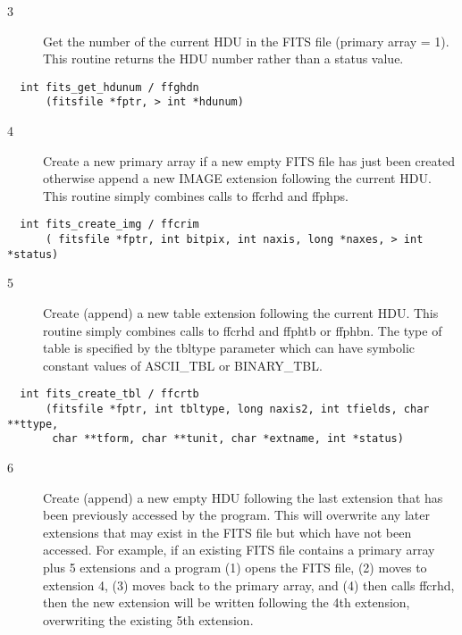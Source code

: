 \begin{description}
\item[3 ] Get the number of the current HDU in the FITS file (primary array = 1).
   This routine returns the HDU number rather than a status value.
\end{description}

\begin{verbatim}
  int fits_get_hdunum / ffghdn
      (fitsfile *fptr, > int *hdunum)
\end{verbatim}

\begin{description}
\item[4 ]Create a new primary array if a new empty FITS file has just been
   created otherwise append a new IMAGE extension following the current HDU.
  This routine simply combines calls to ffcrhd and ffphps.
\end{description}

\begin{verbatim}
  int fits_create_img / ffcrim
      ( fitsfile *fptr, int bitpix, int naxis, long *naxes, > int *status)
\end{verbatim}

\begin{description}
\item[5 ]Create (append) a new table extension following the current HDU.
   This routine simply combines calls to ffcrhd and ffphtb or ffphbn.
   The type of table is specified by the tbltype parameter which can have
  symbolic constant values of ASCII\_TBL or BINARY\_TBL.
\end{description}

\begin{verbatim}
  int fits_create_tbl / ffcrtb
      (fitsfile *fptr, int tbltype, long naxis2, int tfields, char **ttype,
       char **tform, char **tunit, char *extname, int *status)
\end{verbatim}

\begin{description}
\item[6 ]Create (append) a new empty HDU following the last extension that
    has been previously accessed by the program.   This will overwrite
    any later extensions that may exist in the FITS file but which
    have not been accessed.
    For example, if an existing FITS file contains a primary array plus 5
    extensions and a program (1) opens the FITS file, (2) moves to
    extension 4, (3) moves back to the primary array, and (4) then calls
    ffcrhd, then the new extension will be written following the 4th
   extension, overwriting the existing 5th extension.
\end{description}

